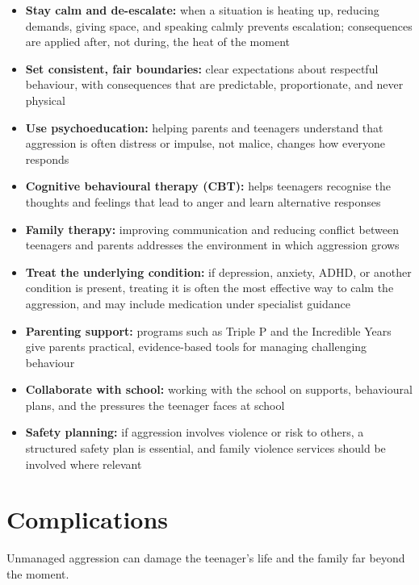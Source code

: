 \begin{itemize}
    \item \textbf{Stay calm and de-escalate:} when a situation is heating up, reducing demands, giving space, and speaking calmly prevents escalation; consequences are applied after, not during, the heat of the moment
    \item \textbf{Set consistent, fair boundaries:} clear expectations about respectful behaviour, with consequences that are predictable, proportionate, and never physical
    \item \textbf{Use psychoeducation:} helping parents and teenagers understand that aggression is often distress or impulse, not malice, changes how everyone responds
    \item \textbf{Cognitive behavioural therapy (CBT):} helps teenagers recognise the thoughts and feelings that lead to anger and learn alternative responses
    \item \textbf{Family therapy:} improving communication and reducing conflict between teenagers and parents addresses the environment in which aggression grows
    \item \textbf{Treat the underlying condition:} if depression, anxiety, ADHD, or another condition is present, treating it is often the most effective way to calm the aggression, and may include medication under specialist guidance
    \item \textbf{Parenting support:} programs such as Triple P and the Incredible Years give parents practical, evidence-based tools for managing challenging behaviour
    \item \textbf{Collaborate with school:} working with the school on supports, behavioural plans, and the pressures the teenager faces at school
    \item \textbf{Safety planning:} if aggression involves violence or risk to others, a structured safety plan is essential, and family violence services should be involved where relevant
\end{itemize}

\section*{Complications}
Unmanaged aggression can damage the teenager's life and the family far beyond the moment.

